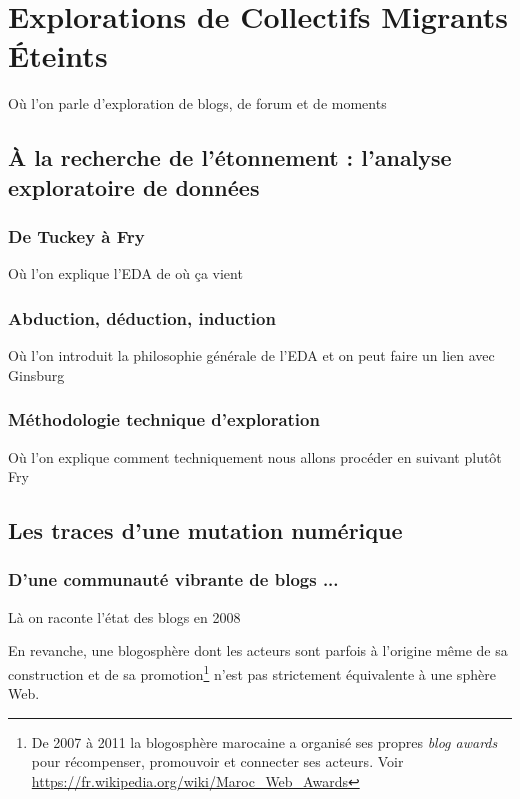 \documentclass[symmetric,justified,marginals=raggedouter]{tufte-book}
\begin{document}

\chapter{Explorations de Collectifs Migrants Éteints}
\label{chap:6}

Où l'on parle d'exploration de blogs, de forum et de moments

\section{À la recherche de l'étonnement : l'analyse exploratoire de données}

\subsection{De Tuckey à Fry}

Où l'on explique l'EDA de où ça vient 

\subsection{Abduction, déduction, induction}

Où l'on introduit la philosophie générale de l'EDA et on peut faire un lien avec Ginsburg

\subsection{Méthodologie technique d'exploration}

Où l'on explique comment techniquement nous allons procéder en suivant plutôt Fry

\section{Les traces d'une mutation numérique}

\subsection{D'une communauté vibrante de blogs ...}

Là on raconte l'état des blogs en 2008

En revanche, une blogosphère dont les acteurs sont parfois à l'origine même de sa construction et de sa promotion\footnote{De 2007 à 2011 la blogosphère marocaine a organisé ses propres \textit{blog awards} pour récompenser, promouvoir et connecter ses acteurs. Voir \url{https://fr.wikipedia.org/wiki/Maroc_Web_Awards}} n'est pas strictement équivalente à une sphère Web. \citep{keren_blogosphere:_2006}
\end{document}
